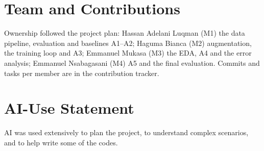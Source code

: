 \documentclass[conference]{IEEEtran}
\newcommand{\MemberOne}{Hassan Adelani Luqman}
\newcommand{\MemberTwo}{Haguma Bianca}
\newcommand{\MemberThree}{Emmanuel Mukasa}
\newcommand{\MemberFour}{Emmanuel Nsabagasani}
\begin{document}










\section*{Team and Contributions}
Ownership followed the project plan: \MemberOne{} (M1) the data pipeline, evaluation and baselines A1--A2; \MemberTwo{} (M2) augmentation, the training loop and A3; \MemberThree{} (M3) the EDA, A4 and the error analysis; \MemberFour{} (M4) A5 and the final evaluation. Commits and tasks per member are in the contribution tracker.

\section*{AI-Use Statement}
AI was used extensively to plan the project, to understand complex scenarios, and to help write some of the codes.



\end{document}
